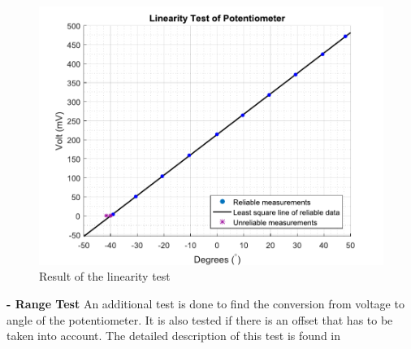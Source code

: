 \begin{figure}[H] 
	\centering 
	\includegraphics[scale=0.5]{figures/linearityOfPotmeterTest2-1}
	\caption{Result of the linearity test}
	\label{linearityOfPotmeterTest}
\end{figure}


\textbf{- Range Test}
An additional test is done to find the conversion from voltage to angle of the potentiometer. It is also tested if there is an offset that has to be taken into account. The detailed description of this test is found in 


